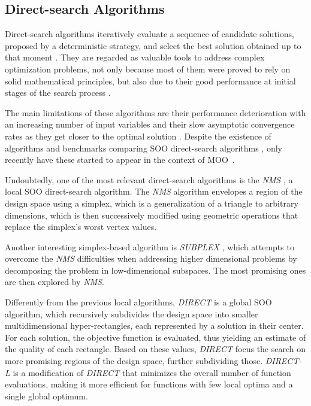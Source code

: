 \subsection{Direct-search Algorithms}
Direct-search algorithms iteratively evaluate a sequence of candidate solutions, proposed by a deterministic strategy, and select the best solution obtained up to that moment \cite{Conn2009}. They are regarded as valuable tools to address complex optimization problems, not only because most of them were proved to rely on solid mathematical principles, but also due to their good performance at initial stages of the search process \cite{Rios2013}. 

The main limitations of these algorithms are their performance deterioration with an increasing number of input variables and their slow asymptotic convergence rates as they get closer to the optimal solution \cite{Kolda2003}. Despite the existence of algorithms and benchmarks comparing \ac{SOO} direct-search algorithms \cite{Wortmann2017GABESTCHOICE,Waibel2018}, only recently have these started to appear in the context of \ac{MOO}~\cite{Custodio2010}.

Undoubtedly, one of the most relevant direct-search algorithms is the \textit{\ac{NMS}} \cite{Nelder1964}, a local \ac{SOO} direct-search algorithm. The \textit{\ac{NMS}} algorithm envelopes a region of the design space using a simplex, which is a generalization of a triangle to arbitrary dimensions, which is then successively modified using geometric operations that replace the simplex's worst vertex values.

Another interesting simplex-based algorithm is \textit{SUBPLEX} \cite{Rowan1990}, which attempts to overcome the \textit{\ac{NMS}} difficulties when addressing higher dimensional problems by decomposing the problem in low\nobreakdash-\hspace{0pt}dimensional
subspaces. The most promising ones are then explored by \textit{\ac{NMS}}.

Differently from the previous local algorithms, \textit{\ac{DIRECT}} \cite{Jones1993DIRECT} is a global \ac{SOO} algorithm, which recursively subdivides the design space into smaller multidimensional hyper-rectangles, each represented by a solution in their center. For each solution, the objective function is evaluated, thus yielding an estimate of the quality of each rectangle. Based on these values, \textit{\ac{DIRECT}} focus the search on more promising regions of the design space, further subdividing those. \textit{\ac{DIRECT}-L} \cite{Gablonsky2001} is a modification of \textit{\ac{DIRECT}} that minimizes the overall number of function evaluations, making it more efficient for functions with few local optima and a single global optimum. 

